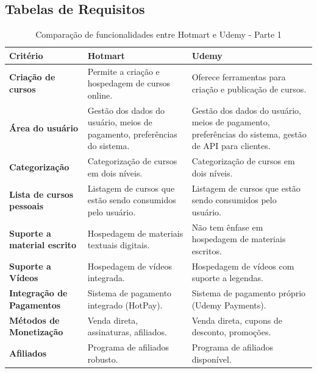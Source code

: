 \begin{apendicesenv}

\partapendices
\chapter{Tabelas de Requisitos}

\begin{table}[h]
    \centering
    \caption{Comparação de funcionalidades entre Hotmart e Udemy - Parte 1}
    \label{tab:comparacao_hotmart_udemy}
    \begin{adjustbox}{width=\textwidth}
    \begin{tabular}{|p{5cm}|p{5cm}|p{5cm}|}
        \hline
        \textbf{Critério} & \textbf{Hotmart} & \textbf{Udemy} \\
        \hline
        \textbf{Criação de cursos} & Permite a criação e hospedagem de cursos online. & Oferece ferramentas para criação e publicação de cursos. \\
        \hline
        \textbf{Área do usuário} & Gestão dos dados do usuário, meios de pagamento, preferências do sistema. & Gestão dos dados do usuário, meios de pagamento, preferências do sistema, gestão de API para clientes. \\
        \hline
        \textbf{Categorização} & Categorização de cursos em dois níveis. & Categorização de cursos em dois níveis. \\
        \hline
        \textbf{Lista de cursos pessoais} & Listagem de cursos que estão sendo consumidos pelo usuário. & Listagem de cursos que estão sendo consumidos pelo usuário. \\
        \hline
        \textbf{Suporte a material escrito} & Hospedagem de materiais textuais digitais. & Não tem ênfase em hospedagem de materiais escritos. \\
        \hline
        \textbf{Suporte a Vídeos} & Hospedagem de vídeos integrada. & Hospedagem de vídeos com suporte a legendas. \\
        \hline
        \textbf{Integração de Pagamentos} & Sistema de pagamento integrado (HotPay). & Sistema de pagamento próprio (Udemy Payments). \\
        \hline
        \textbf{Métodos de Monetização} & Venda direta, assinaturas, afiliados. & Venda direta, cupons de desconto, promoções. \\
        \hline
        \textbf{Afiliados} & Programa de afiliados robusto. & Programa de afiliados disponível. \\

\end{tabular}
\end{adjustbox}
\end{table}
\end{apendicesenv}
